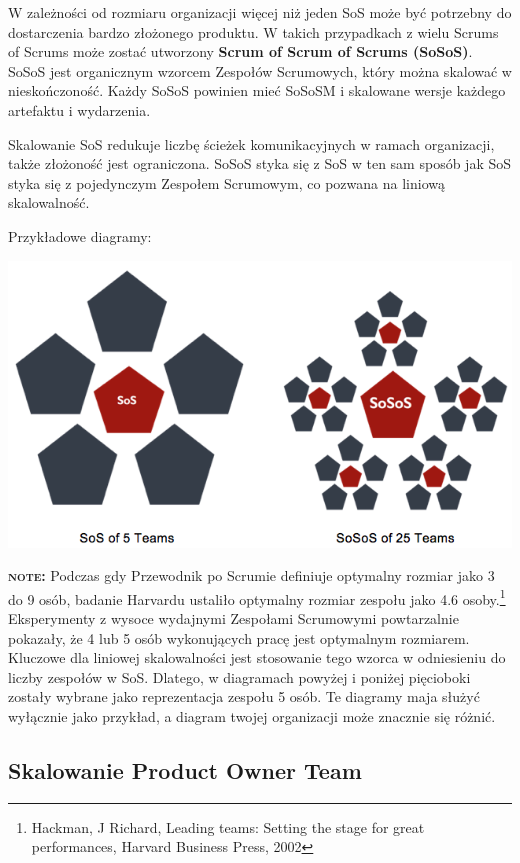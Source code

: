 \documentclass[12pt,a4paper,parskip=full]{scrartcl}
\begin{document}
W zależności od rozmiaru organizacji więcej niż jeden SoS może być potrzebny do dostarczenia bardzo złożonego produktu. W takich przypadkach z wielu  Scrums of Scrums może zostać utworzony \textbf{Scrum of Scrum of Scrums (SoSoS)}. SoSoS jest organicznym wzorcem Zespołów Scrumowych, który można skalować w nieskończoność. Każdy SoSoS powinien mieć SoSoSM i skalowane wersje każdego artefaktu i wydarzenia.

Skalowanie SoS redukuje liczbę ścieżek komunikacyjnych w ramach organizacji, także złożoność jest ograniczona. SoSoS styka się z SoS w ten sam sposób jak SoS styka się z pojedynczym Zespołem Scrumowym, co pozwana na liniową skalowalność.

Przykładowe diagramy:

\includegraphics[width=1.0\linewidth]{Sos-R2.png}

\textbf{\textsc{note:}} Podczas gdy Przewodnik po Scrumie definiuje optymalny rozmiar jako 3 do 9 osób, badanie Harvardu ustaliło optymalny rozmiar zespołu jako 4.6 osoby.\footnote{Hackman, J Richard, Leading teams: Setting the stage for great performances, Harvard Business Press, 2002} Eksperymenty z wysoce wydajnymi Zespołami Scrumowymi powtarzalnie pokazały, że 4 lub 5 osób wykonujących pracę jest optymalnym rozmiarem. Kluczowe dla liniowej skalowalności jest stosowanie tego wzorca w odniesieniu do liczby zespołów w SoS. Dlatego, w diagramach powyżej i poniżej pięcioboki zostały wybrane jako reprezentacja zespołu 5 osób. Te diagramy maja służyć wyłącznie jako przykład, a diagram twojej organizacji może znacznie się różnić.

\subsection{Skalowanie Product Owner Team}
\end{document}
